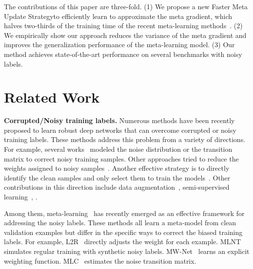 \documentclass[final]{cvpr}
\newcommand{\methodname}{Faster Meta Update Strategy}
\begin{document}
The contributions of this paper are three-fold. (1) We propose a new \methodname\space to efficiently learn to approximate the meta gradient, which halves two-thirds of the training time of the recent meta-learning methods~\cite{ren2018learning, shu2019meta, wang2020training}.
(2) We empirically show our approach reduces the variance of the meta gradient and improves the generalization performance of the meta-learning model. 
(3) Our method achieves state-of-the-art performance on several benchmarks with noisy labels. 
 
\section{Related Work}

\noindent\textbf{Corrupted/Noisy training labels.} 
Numerous methods have been recently proposed to learn robust deep networks that can overcome corrupted or noisy training labels. These methods address this problem from a variety of directions. For example, several works~\cite{goldberger2016training, patrini2017making, xia2019anchor, tanaka2018joint, yi2019probabilistic, arazo2019unsupervised, wang2020training} modeled the noise distribution or the transition matrix to correct noisy training samples.
Other approaches tried to reduce the weights assigned to noisy samples~\cite{malach2017decoupling, jiang2017mentornet, jiang2020beyond, su2017pose, shu2019meta, yang2019snapshot}. Another effective strategy is to directly identify the clean samples and only select them to train the models~\cite{han2018co, yu2019does, northcutt2019confident, pleiss2020identifying, li2020dividemix, wei2020combating}. Other contributions in this direction include data augmentation~\cite{zhang2017mixup, liang2020simaug, cheng2020advaug}, semi-supervised learning~\cite{hendrycks2018using, vahdat2017toward, li2020dividemix, zhang2020distilling}, \etc. 

Among them, meta-learning~\cite{ren2018learning, shu2019meta, li2019learning, wang2020training} has recently emerged as an effective framework for addressing the noisy labels. These methods all learn a meta-model from clean validation examples but differ in the specific ways to correct the biased training labels. For example, L2R~\cite{ren2018learning} directly adjusts the weight for each example. MLNT~\cite{li2019learning} simulates regular training with synthetic noisy labels. MW-Net~\cite{shu2019meta} learns an explicit weighting function. MLC~\cite{wang2020training} estimates the noise transition matrix.
\end{document}
